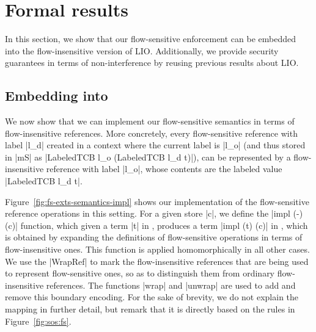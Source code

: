 \section{Formal results}
\label{sec:soundness}

In this section, we show that our flow-sensitive enforcement can be
embedded into the flow-insensitive version of LIO. Additionally, we
provide security guarantees in terms of non-interference by reusing
previous results about LIO.

\subsection{Embedding into \lio{}}

We now show that we can implement our flow-sensitive semantics in terms of
flow-insensitive references. More concretely, every flow-sensitive reference
with label |l_d| created in a context where the current label is |l_o| (and
thus stored in |mS| as |LabeledTCB l_o (LabeledTCB l_d t)|), can be represented
by a flow-insensitive reference with label |l_o|, whose contents are the
labeled value |LabeledTCB l_d t|.

Figure~\ref{fig:fs-exts-semantics-impl} shows our implementation of
the flow-sensitive reference operations in this setting.  For a given
store |c|, we define the |impl (-) (c)| function, which given a term
|t| in \liofs{}, produces a term |impl (t) (c)| in \lio{}, which is
obtained by expanding the definitions of flow-sensitive operations in
terms of flow-insensitive ones. This function is applied
homomorphically in all other cases. We use the |WrapRef| to mark
the flow-insensitive references that are being used to represent
flow-sensitive ones, so as to distinguish them from ordinary
flow-insensitive references. The functions |wrap| and |unwrap| are
used to add and remove this boundary encoding.
%
%
For the sake of brevity, we do not explain the mapping in further
detail, but remark that it is directly based on the rules in
Figure~\ref{fig:sos:fs}.
%

